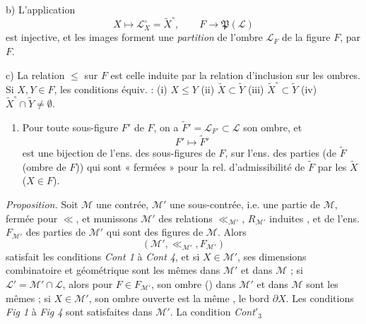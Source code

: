 \documentclass[11pt,a4paper]{article}
\begin{document}
b) L'application
\[
  X \longmapsto \mathcal{L}^{\circ}_X = \widetilde{X}^{\circ}, \qquad F \longrightarrow \mathfrak{P}(\mathcal{L})
\]
est injective, et \struck{\ill{}} les images forment une \emph{partition} de l'ombre $\mathcal{L}_F$ de la figure $F$,  par $F$.

c)  La relation $\leq$ sur $F$ est celle induite par la relation d'inclusion sur les ombres. Si $X, Y \in F$, les conditions équiv. :
(i) $X \leq Y$ \quad (ii) $\widetilde{X} \subset \widetilde{Y}$ \quad (iii) $\widetilde{X}^{\circ} \subset \widetilde{Y}$ \quad (iv) $\widetilde{X}^{\circ} \cap \widetilde{Y} \neq \emptyset$.

\begin{enumerate}
  \item[d)]  Pour toute sous-figure $F'$ de $F$, on a $\widetilde{F}' = \mathcal{L}_{F'} \subset \mathcal{L}$ son ombre, et
  \[
    F' \longmapsto \widetilde{F}'
  \]
  est une bijection de l'ens. des sous-figures de $F$, sur l'ens. des parties (de $\widetilde{F}$ (ombre de $F$)) qui sont « fermées » \ill{} pour la rel. d'admissibilité de $\widetilde{F}$ par les $\widetilde{X}$ ($X \in F$).
\end{enumerate}

\emph{Proposition.} Soit $\mathcal{M}$ une contrée, $\mathcal{M}'$ une sous-contrée, \struck{\ill{}} i.e. une partie de $\mathcal{M}$, fermée pour $\ll$, et munissons $\mathcal{M}'$ des relations $\ll_{\mathcal{M}'}$, $R_{\mathcal{M}'}$ induites \ill{}, et de l'ens. $F_{\mathcal{M}'}$ des parties \struck{\ill{}} de $\mathcal{M}'$ qui sont des figures de $\mathcal{M}$. Alors
\[
  (\mathcal{M}', \ll_{\mathcal{M}'}, F_{\mathcal{M}'})
\]
satisfait les conditions \emph{Cont 1} à \emph{Cont 4}, et si $X \in \mathcal{M}'$, ses dimensions combinatoire et géométrique sont les mêmes dans $\mathcal{M}'$ et dans $\mathcal{M}$ ; si $\mathcal{L}' = \mathcal{M}' \cap \mathcal{L}$, alors pour $F \in F_{\mathcal{M}'}$, son ombre () dans $\mathcal{M}'$ et dans $\mathcal{M}$ sont les mêmes ; si $X \in \mathcal{M}'$, \struck{\ill{}} son ombre ouverte est la même , \ill{} le bord $\partial X$. Les conditions \emph{Fig 1} à \emph{Fig 4} sont satisfaites dans $\mathcal{M}'$. La condition \emph{Cont$'_3$} \struck{\ill{}}
\end{document}
